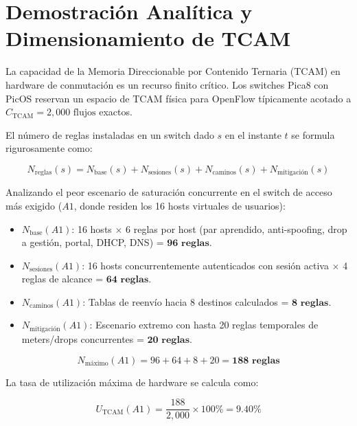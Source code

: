 \documentclass[11pt,a4paper]{report}
\begin{document}
\section{Demostración Analítica y Dimensionamiento de TCAM}
La capacidad de la Memoria Direccionable por Contenido Ternaria (TCAM) en hardware de conmutación es un recurso finito crítico. Los switches Pica8 con PicOS reservan un espacio de TCAM física para OpenFlow típicamente acotado a $C_{\text{TCAM}} = 2,000\text{ flujos}$ exactos.

El número de reglas instaladas en un switch dado $s$ en el instante $t$ se formula rigurosamente como:

\begin{equation}
N_{\text{reglas}}(s) = N_{\text{base}}(s) + N_{\text{sesiones}}(s) + N_{\text{caminos}}(s) + N_{\text{mitigación}}(s)
\end{equation}

Analizando el peor escenario de saturación concurrente en el switch de acceso más exigido ($A1$, donde residen los 16 hosts virtuales de usuarios):
\begin{itemize}[leftmargin=*]
    \item $N_{\text{base}}(A1)$: 16 hosts $\times$ 6 reglas por host (par aprendido, anti-spoofing, drop a gestión, portal, DHCP, DNS) = $\mathbf{96\text{ reglas}}$.
    \item $N_{\text{sesiones}}(A1)$: 16 hosts concurrentemente autenticados con sesión activa $\times$ 4 reglas de alcance = $\mathbf{64\text{ reglas}}$.
    \item $N_{\text{caminos}}(A1)$: Tablas de reenvío hacia 8 destinos calculados = $\mathbf{8\text{ reglas}}$.
    \item $N_{\text{mitigación}}(A1)$: Escenario extremo con hasta 20 reglas temporales de meters/drops concurrentes = $\mathbf{20\text{ reglas}}$.
\end{itemize}

\begin{equation}
N_{\text{máximo}}(A1) = 96 + 64 + 8 + 20 = \mathbf{188\text{ reglas}}
\end{equation}

La tasa de utilización máxima de hardware se calcula como:

\begin{equation}
U_{\text{TCAM}}(A1) = \frac{188}{2,000} \times 100\% = \mathbf{9.40\%}
\end{equation}
\end{document}
